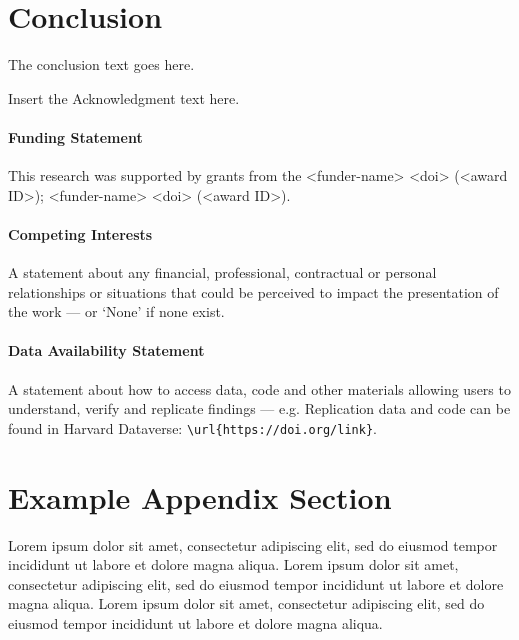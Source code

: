 \documentclass[
  journal=largetwo,
  manuscript=article-type,
  year=2020,
  volume=37,
]{cup-journal}
\begin{document}
\section{Conclusion}
The conclusion text goes here.


\begin{acknowledgement}
Insert the Acknowledgment text here.
\end{acknowledgement}

\paragraph{Funding Statement}

This research was supported by grants from the <funder-name> <doi> (<award ID>); <funder-name> <doi> (<award ID>).

\paragraph{Competing Interests}

A statement about any financial, professional, contractual or personal relationships or situations that could be perceived to impact the presentation of the work --- or `None' if none exist.

\paragraph{Data Availability Statement}

A statement about how to access data, code and other materials allowing users to understand, verify and replicate findings --- e.g. Replication data and code can be found in Harvard Dataverse: \verb+\url{https://doi.org/link}+.



\printendnotes

\printbibliography

\appendix

\section{Example Appendix Section}

Lorem ipsum dolor sit amet, consectetur adipiscing elit, sed do eiusmod tempor incididunt ut labore et dolore magna aliqua. Lorem ipsum dolor sit amet, consectetur adipiscing elit, sed do eiusmod tempor incididunt ut labore et dolore magna aliqua. Lorem ipsum dolor sit amet, consectetur adipiscing elit, sed do eiusmod tempor incididunt ut labore et dolore magna aliqua. 
\end{document}
